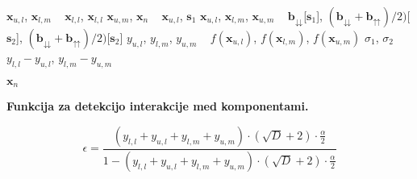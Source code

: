\begin{algorithm}
    \DontPrintSemicolon

    $\mathbf{x}_{u,l}$, $\mathbf{x}_{l,m}$ \gets~ $\mathbf{x}_{l,l}$, $\mathbf{x}_{l,l}$\;
    $\mathbf{x}_{u,m}$, $\mathbf{x}_n$ \gets~ $\mathbf{x}_{u,l}$, $\mathbf{s}_1$\;
    $\mathbf{x}_{u,l}$, $\mathbf{x}_{l,m}$, $\mathbf{x}_{u,m}$ \gets~ $\mathbf{b}_{\downdownarrows}$[$\mathbf{s}_1$], $(\mathbf{b}_{\downdownarrows} + \mathbf{b}_{\upuparrows}) / 2)$[$\mathbf{s}_2$], $(\mathbf{b}_{\downdownarrows} + \mathbf{b}_{\upuparrows}) / 2)$[$\mathbf{s}_2$]\;
    $y_{u,l}$, $y_{l,m}$, $y_{u,m}$ \gets~ $f(\mathbf{x}_{u,l})$, $f(\mathbf{x}_{l,m})$, $f(\mathbf{x}_{u,m})$\;
    $\sigma_1$, $\sigma_2$ \gets~ $y_{l,l} - y_{u,l}$, $y_{l,m} - y_{u,m}$\;

    \Return $\mathbf{x}_n$
 
	\caption{\textbf{Funkcija za detekcijo interakcije med komponentami.}}
	\label{pcode:interact:rdg}
\end{algorithm}

\begin{equation}\label{eq:rdg2:epsilon}
    \epsilon = \frac{(y_{l,l} + y_{u,l} + y_{l,m} + y_{u,m}) \cdot (\sqrt{D} + 2) \cdot \frac{\alpha}{2}}{1 - (y_{l,l} + y_{u,l} + y_{l,m} + y_{u,m}) \cdot (\sqrt{D} + 2) \cdot \frac{\alpha}{2}}
\end{equation}

